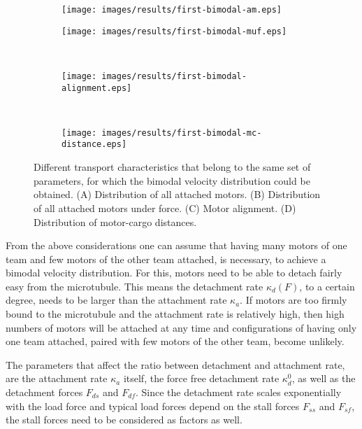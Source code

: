 \renewcommand{\thesubfigure}{\Alph{subfigure}}
\begin{figure}
\centering
\captionsetup[subfigure]{justification=justified,singlelinecheck=false,labelformat=simple}
\begin{subfigure}{0.35\textwidth}
 \subcaption{}
 \texttt{[image: images/results/first-bimodal-am.eps]}
\end{subfigure}
\begin{subfigure}{0.35\textwidth}
 \subcaption{}
 \texttt{[image: images/results/first-bimodal-muf.eps]}
\end{subfigure}\\
\begin{subfigure}{0.5\textwidth}
 \subcaption{}
 \texttt{[image: images/results/first-bimodal-alignment.eps]}
\end{subfigure}\\
\begin{subfigure}{0.6\textwidth}
 \subcaption{}
 \texttt{[image: images/results/first-bimodal-mc-distance.eps]}
\end{subfigure}
\caption[Diagrams of different transport characteristics for the bimodal velocity distribution]{Different transport characteristics that belong to the same set of parameters, for which the bimodal velocity distribution could be obtained. (A) Distribution of all attached motors. (B) Distribution of all attached motors under force. (C) Motor alignment. (D) Distribution of motor-cargo distances.}
\label{img.first-bimodal-transport-properties}
\end{figure}
\renewcommand{\thesubfigure}{\alph{subfigure}}

From the above considerations one can assume that having many motors of one team and few motors of the other team attached, is necessary, to achieve a bimodal velocity distribution. For this,
motors need to be able to detach fairly easy from the microtubule. This means the detachment rate $\kappa_d\left(F\right)$, to a certain degree, needs to be larger than the attachment rate
$\kappa_a$. If motors are too firmly bound to the microtubule and the attachment rate is relatively high, then high numbers of motors will be attached at any time and configurations of having only
one team attached, paired with few motors of the other team, become unlikely.

The parameters that affect the ratio between detachment and attachment rate, are the attachment rate $\kappa_a$ itself, the force free detachment rate $\kappa_d^0$, as well as the detachment
forces $F_{ds}$ and $F_{df}$. Since the detachment rate scales exponentially with the load force and typical load forces depend on the stall forces $F_{ss}$ and $F_{sf}$, the stall forces need to
be considered as factors as well.

